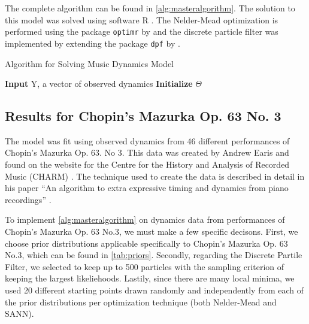 \documentclass[12pt]{article}
\begin{document}
The complete algorithm can be found in \autoref{alg:masteralgorithm}.
The solution to this model was solved using software R
\citet{r_core_team_r_2019}. The Nelder-Mead optimization is performed
using the package \texttt{optimr} by \citet{nash_optimr_2019} and the
discrete particle filter was implemented by extending the package
\texttt{dpf} by \citet{mcdonald_dpf_2020}.

\begin{algorithm}[H]
 \caption{Algorithm for Solving Music Dynamics Model\label{alg:masteralgorithm}}
\SetAlgoLined
 \textbf{Input} Y, a vector of observed dynamics\;
 \textbf{Initialize} $\Theta$\;
\end{algorithm}

\subsection{Results for Chopin's Mazurka Op. 63 No. 3}

The model was fit using observed dynamics from 46 different performances
of Chopin's Mazurka Op. 63. No 3. This data was created by Andrew Earis
\citet{earis_mazurka_2009} and found on the website for the Centre for
the History and Analysis of Recorded Music (CHARM)
\citet{charm_centre_2009}. The technique used to create the data is
described in detail in his paper ``An algorithm to extra expressive
timing and dynamics from piano recordings''
\citet{earis_algorithm_2007}.

To implement \autoref{alg:masteralgorithm} on dynamics data from
performances of Chopin's Mazurka Op. 63 No.3, we must make a few
specific decisons. First, we choose prior distributions applicable
specifically to Chopin's Mazurka Op. 63 No.3, which can be found in
\autoref{tab:priors}. Secondly, regarding the Discrete Partile Filter,
we selected to keep up to 500 particles with the sampling criterion of
keeping the largest likeliehoods. Lastily, since there are many local
minima, we used 20 different starting points drawn randomly and
independently from each of the prior distributions per optimization
technique (both Nelder-Mead and SANN).
\end{document}
